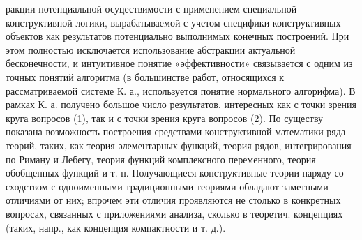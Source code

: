 \documentclass[10pt]{article}
\begin{document}
ракции потенциальной осуцествимости с применением специальной конструктивной логики, вырабатываемой с учетом специфики конструктивных объектов как результатов потенциально выполнимых конечных построений. При этом полностью исключается использование абстракции актуальной бесконечности, и интуитивное понятие «әффективности» связывается с одним из точных понятий алгоритма (в большинстве работ, относящихся к рассматриваемой системе $К$. а., используется понятие нормального алгорифма). В рамках К. а. получено большое число результатов, интересных как с точки зрения круга вопросов (1), так и с точки зрения круга вопросов (2). По существу показана возможность построения средствами конструктивной математики ряда теорий, таких, как теория әлементарных функций, теория рядов, интегрирования по Риману и Лебегу, теория функций комплексного переменного, теория обобщенных функций и т. п. Получающиеся конструктивные теории наряду со сходством с одноименными традиционными теориями обладают заметными отличиями от них; впрочем эти отличия проявляются не столько в конкретных вопросах, связанных с приложениями анализа, сколько в теоретич. концепциях (таких, напр., как концепция компактности и т. д.).
\end{document}
